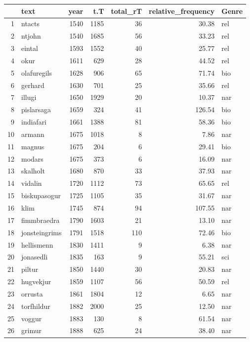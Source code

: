 \documentclass[output=paper,colorlinks,citecolor=brown]{langscibook}
\begin{document}
\begin{paperappendix}
\begin{table}
\small
\begin{tabularx}{\textwidth}{rXrrrrl}
\lsptoprule
 & text & year & t.T & total\_rT & relative\_frequency & Genre \\
\midrule
1 & ntacts & 1540 & 1185 &  36 & 30.38 & rel \\
2 & ntjohn & 1540 & 1685 &  56 & 33.23 & rel \\
3 & eintal & 1593 & 1552 &  40 & 25.77 & rel \\
4 & okur & 1611 & 629 &  28 & 44.52 & rel \\
5 & olafuregils & 1628 & 906 &  65 & 71.74 & bio \\
6 & gerhard & 1630 & 701 &  25 & 35.66 & rel \\
7 & illugi & 1650 & 1929 &  20 & 10.37 & nar \\
8 & pislarsaga & 1659 & 324 &  41 & 126.54 & bio \\
9 & indiafari & 1661 & 1388 &  81 & 58.36 & bio \\
10 & armann & 1675 & 1018 &   8 & 7.86 & nar \\
11 & magnus & 1675 & 204 &   6 & 29.41 & bio \\
12 & modars & 1675 & 373 &   6 & 16.09 & nar \\
13 & skalholt & 1680 & 870 &  33 & 37.93 & nar \\
14 & vidalin & 1720 & 1112 &  73 & 65.65 & rel \\
15 & biskupasogur & 1725 & 1105 &  35 & 31.67 & nar \\
16 & klim & 1745 & 874 &  94 & 107.55 & nar \\
17 & fimmbraedra & 1790 & 1603 &  21 & 13.10 & nar \\
18 & jonsteingrims & 1791 & 1518 & 110 & 72.46 & bio \\
19 & hellismenn & 1830 & 1411 &   9 & 6.38 & nar \\
20 & jonasedli & 1835 & 163 &   9 & 55.21 & sci \\
21 & piltur & 1850 & 1440 &  30 & 20.83 & nar \\
22 & hugvekjur & 1859 & 1107 &  56 & 50.59 & rel \\
23 & orrusta & 1861 & 1804 &  12 & 6.65 & nar \\
24 & torfhildur & 1882 & 2000 &  25 & 12.50 & nar \\
25 & voggur & 1883 & 130 &   8 & 61.54 & nar \\
26 & grimur & 1888 & 625 &  24 & 38.40 & nar \\

\end{tabularx}
\end{table}
\end{paperappendix}
\end{document}
